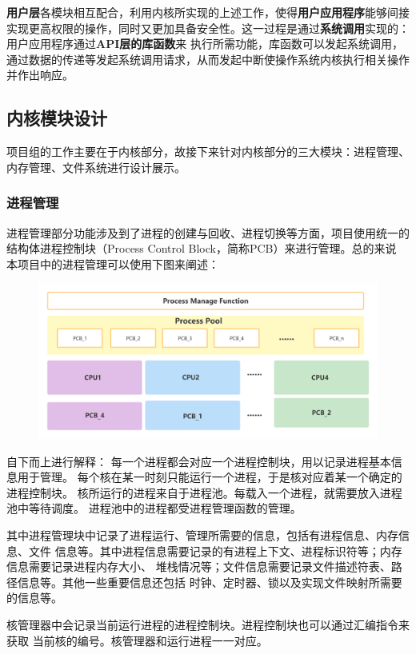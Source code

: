\documentclass[UTF8,a4paper,10pt]{ctexart}
\begin{document}
\textbf{用户层}各模块相互配合，利用内核所实现的上述工作，使得\textbf{用户应用程序}能够间接实现更高权限的操作，同时又更加具备安全性。这一过程是通过\textbf{系统调用}实现的：
用户应用程序通过\textbf{API层的库函数}来
执行所需功能，库函数可以发起系统调用，通过数据的传递等发起系统调用请求，从而发起中断使操作系统内核执行相关操作并作出响应。

\subsection{内核模块设计}
项目组的工作主要在于内核部分，故接下来针对内核部分的三大模块：进程管理、内存管理、文件系统进行设计展示。
\subsubsection{进程管理}

进程管理部分功能涉及到了进程的创建与回收、进程切换等方面，项目使用统一的
结构体进程控制块（Process Control Block，简称PCB）来进行管理。总的来说
本项目中的进程管理可以使用下图来阐述：

\begin{figure}[H]
  \centering
  \includegraphics[scale=0.15]{image/design_proc.png}
\end{figure}

自下而上进行解释：
每一个进程都会对应一个进程控制块，用以记录进程基本信息用于管理。
每个核在某一时刻只能运行一个进程，于是核对应着某一个确定的进程控制块。
核所运行的进程来自于进程池。每载入一个进程，就需要放入进程池中等待调度。
进程池中的进程都受进程管理函数的管理。

其中进程管理块中记录了进程运行、管理所需要的信息，包括有进程信息、内存信息、文件
信息等。其中进程信息需要记录的有进程上下文、进程标识符等；内存信息需要记录进程内存大小、
堆栈情况等；文件信息需要记录文件描述符表、路径信息等。其他一些重要信息还包括
时钟、定时器、锁以及实现文件映射所需要的信息等。

核管理器中会记录当前运行进程的进程控制块。进程控制块也可以通过汇编指令来获取
当前核的编号。核管理器和运行进程一一对应。
\end{document}
